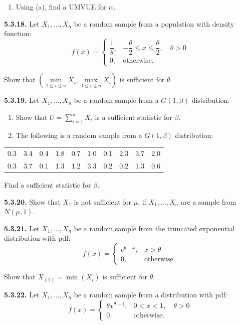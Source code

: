 \begin{enumerate}
\item[\textbf{(b)}] Using (a), find a UMVUE for $\alpha$.
\end{enumerate}

\textbf{5.3.18.} Let $X_1, \ldots, X_n$ be a random sample from a population with density function:
$$f(x) = \begin{cases} \dfrac{1}{\theta}, & -\dfrac{\theta}{2} \leq x \leq \dfrac{\theta}{2}, \quad \theta > 0 \\ 0, & \text{otherwise.} \end{cases}$$

Show that $\left(\min\limits_{1 \leq i \leq n} X_i, \max\limits_{1 \leq i \leq n} X_i\right)$ is sufficient for $\theta$.

\textbf{5.3.19.} Let $X_1, \ldots, X_n$ be a random sample from a $G(1, \beta)$ distribution.
\begin{enumerate}
\item[\textbf{(a)}] Show that $U = \sum_{i=1}^{n} X_i$ is a sufficient statistic for $\beta$.
\item[\textbf{(b)}] The following is a random sample from a $G(1, \beta)$ distribution:
\end{enumerate}

\begin{center}
\begin{tabular}{cccccccccc}
0.3 & 3.4 & 0.4 & 1.8 & 0.7 & 1.0 & 0.1 & 2.3 & 3.7 & 2.0 \\
0.3 & 3.7 & 0.1 & 1.3 & 1.2 & 3.3 & 0.2 & 0.2 & 1.3 & 0.6 \\
\end{tabular}
\end{center}

Find a sufficient statistic for $\beta$.

\textbf{5.3.20.} Show that $X_1$ is not sufficient for $\mu$, if $X_1, \ldots, X_n$ are a sample from $N(\mu, 1)$.

\textbf{5.3.21.} Let $X_1, \ldots, X_n$ be a random sample from the truncated exponential distribution with pdf:
$$f(x) = \begin{cases} e^{\theta - x}, & x > \theta \\ 0, & \text{otherwise.} \end{cases}$$

Show that $X_{(1)} = \min(X_i)$ is sufficient for $\theta$.

\textbf{5.3.22.} Let $X_1, \ldots, X_n$ be a random sample from a distribution with pdf:
$$f(x) = \begin{cases} \theta x^{\theta-1}, & 0 < x < 1, \quad \theta > 0 \\ 0, & \text{otherwise.} \end{cases}$$

